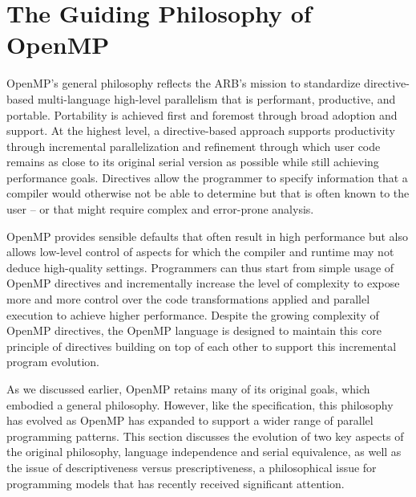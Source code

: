 \section{The Guiding Philosophy of OpenMP}
\label{sec:philosophy}

OpenMP's general philosophy reflects the ARB's mission to standardize 
directive-based multi-language high-level parallelism that is performant, 
productive, and portable. Portability is achieved first and foremost through
broad adoption and support. At the highest level, a directive-based approach 
supports productivity through incremental parallelization and refinement 
through which user code remains as close to its original serial version as 
possible while still achieving performance goals. Directives allow the 
programmer to specify information that a compiler would otherwise not be 
able to determine but that is often known to the user -- or that might require
complex and error-prone analysis.

OpenMP provides sensible defaults that often result in high performance but 
also allows low-level control of aspects for which the compiler and runtime 
may not deduce high-quality settings. Programmers can thus start from simple
usage of OpenMP directives and incrementally increase the level of complexity 
to expose more and more control over the code transformations applied and 
parallel execution to achieve higher performance. Despite the growing
complexity of OpenMP directives, the OpenMP language is designed to maintain 
this core principle of directives building on top of each other to support 
this incremental program evolution.

As we discussed earlier, OpenMP retains many of its original goals, which 
embodied a general philosophy. However, like the specification, this philosophy
has evolved as OpenMP has expanded to support a wider range of parallel 
programming patterns. This section discusses the evolution of two key aspects 
of the original philosophy, language independence and serial equivalence, as 
well as the issue of descriptiveness versus prescriptiveness, a philosophical 
issue for programming models that has recently received significant attention.




